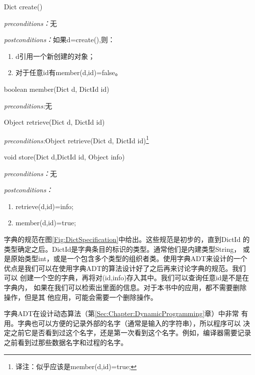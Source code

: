 \begin{figure*}[!t]
\colorbox[rgb]{0.9, 0.9, 0.9}{Dict create()}

\emph{preconditions：}无

\emph{postconditions：}如果d=create(),则：
\begin{enumerate}
\item d引用一个新创建的对象；
\item 对于任意id有member(d,id)=false。
\end{enumerate}

\colorbox[rgb]{0.9, 0.9, 0.9}{boolean member(Dict d, DictId id)}

\emph{preconditions:}无

\colorbox[rgb]{0.9, 0.9, 0.9}{Object retrieve(Dict d, DictId id)}

\emph{preconditions:}Object retrieve(Dict d, DictId id)\footnote{译注：似乎应该是member(d,id)=true;}

\colorbox[rgb]{0.9, 0.9, 0.9}{void store(Dict d,DictId id, Object info)}

\emph{preconditions：}无

\emph{postconditions：}
\begin{enumerate}
\item retrieve(d,id)=info;
\item member(d,id)=true;
\end{enumerate}

    \caption{字典ADT的规范，当DictId指定为某个具体类型才可以。构造函数
            是create；member和retrieve是存取函数；store是处理函数。类中
            比\textbf{Object}一般的信息数据的规范以类似的方法定义。}
    \label{Fig:DictSpecification}
\end{figure*}

字典的规范在图\ref{Fig:DictSpecification}中给出。这些规范是初步的，直到DictId
的类型确定之后。DictId是字典条目的标识的类型。通常他们是内建类型String，
或是原始类型int，或是一个包含多个类型的组织者类。使用字典ADT来设计的一个
优点是我们可以在使用字典ADT的算法设计好了之后再来讨论字典的规范。我们可以
创建一个空的字典，再将对(id,info)存入其中。我们可以查询任意id是不是在字典内，
如果在我们可以检索出里面的信息。对于本书中的应用，都不需要删除操作，但是其
他应用，可能会需要一个删除操作。

字典ADT在设计动态算法（第\ref{Sec:Chapter:DynamicProgramming}章）中非常
有用。字典也可以方便的记录外部的名字（通常是输入的字符串），所以程序可以
决定之前它是否看到过这个名字，还是第一次看到这个名字。例如，编译器需要记录
之前看到过那些数据名字和过程的名字。
